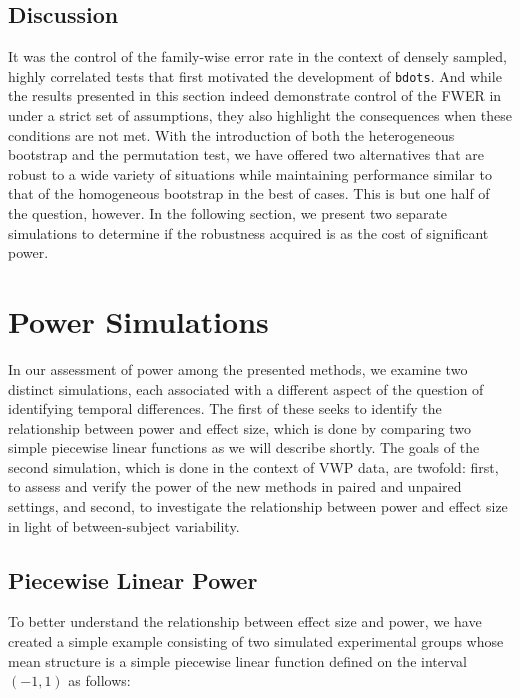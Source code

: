 \documentclass{article}
\newcommand{\xt}{\texttt}
\begin{document}
\subsection{Discussion}


It was the control of the family-wise error rate in the context of densely sampled, highly correlated tests that first motivated the development of \xt{bdots}. And while the results presented in this section indeed demonstrate control of the FWER in under a strict set of assumptions, they also highlight the consequences when these conditions are not met. With the introduction of both the heterogeneous bootstrap and the permutation test, we have offered two alternatives that are robust to a wide variety of situations while maintaining performance similar to that of the homogeneous bootstrap in the best of cases. This is but one half of the question, however. In the following section, we present two separate simulations to determine if the robustness acquired is as the cost of significant power.



\section{Power Simulations}

In our assessment of power among the presented methods, we examine two distinct simulations, each associated with a different aspect of the question of identifying temporal differences. The first of these seeks to identify the relationship between power and effect size, which is done by comparing two simple piecewise linear functions as we will describe shortly. The goals of the second simulation, which is done in the context of VWP data, are twofold: first, to assess and verify the power of the new methods in paired and unpaired settings, and second, to investigate the relationship between power and effect size in light of between-subject variability.

\subsection{Piecewise Linear Power}

To better understand the relationship between effect size and power, we have created a simple example consisting of two simulated experimental groups whose mean structure is a simple piecewise linear function defined on the interval $(-1, 1)$ as follows:

\end{document}

